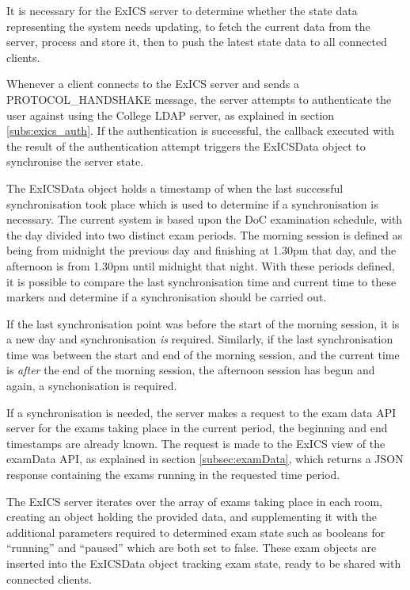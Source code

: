 It is necessary for the ExICS server to determine whether the state data representing the system needs updating, to fetch the current data from the server, process and store it, then to push the latest state data to all connected clients.

Whenever a client connects to the ExICS server and sends a PROTOCOL\_HANDSHAKE message, the server attempts to authenticate the user against using the College LDAP server, as explained in section \ref{subs:exics_auth}.  If the authentication is successful, the callback executed with the result of the authentication attempt triggers the ExICSData object to synchronise the server state.

The ExICSData object holds a timestamp of when the last successful synchronisation took place which is used to determine if a synchronisation is necessary.  The current system is based upon the DoC examination schedule, with the day divided into two distinct exam periods.  The morning session is defined as being from midnight the previous day and finishing at 1.30pm that day, and the afternoon is from 1.30pm until midnight that night.  With these periods defined, it is possible to compare the last synchronisation time and current time to these markers and determine if a synchronisation should be carried out.

If the last synchronisation point was before the start of the morning session, it is a new day and synchronisation \textit{is} required.  Similarly, if the last synchronisation time was between the start and end of the morning session, and the current time is \textit{after} the end of the morning session, the afternoon session has begun and again, a synchonisation is required.

If a synchronisation is needed, the server makes a request to the exam data API server for the exams taking place in the current period, the beginning and end timestamps are already known.  The request is made to the ExICS view of the examData API, as explained in section \ref{subsec:examData}, which returns a JSON response containing the exams running in the requested time period.

The ExICS server iterates over the array of exams taking place in each room, creating an object holding the provided data, and supplementing it with the additional parameters required to determined exam state such as booleans for ``running'' and ``paused'' which are both set to false. These exam objects are inserted into the ExICSData object tracking exam state, ready to be shared with connected clients.

